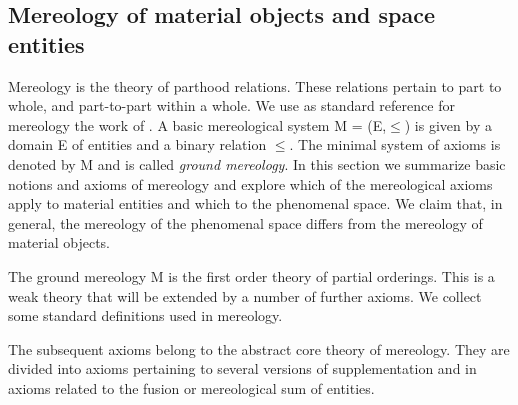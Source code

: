 \documentclass{ao2e}
\begin{document}
{\subsection{Mereology of material objects and space entities}           
Mereology is the theory of parthood relations. These relations pertain to part to whole, and part-to-part within a whole. We use as standard reference for mereology the work of \cite{simons-p-1987-a}. A basic mereological system M = (E,$\leq$) is given by a domain E of entities and a binary relation $\leq$. The minimal system of axioms is denoted by M and is called \textit{ground mereology}. In this section we summarize basic notions and axioms of mereology and explore which of the mereological axioms apply to material entities and which to the phenomenal space. We claim that, in general, the mereology of the phenomenal space differs from the mereology of material objects. 


\begin{enumAx}[MA]
   
   
\end{enumAx}  

The ground mereology M is the first order theory of partial orderings. This is a weak theory that will be extended by a number of further axioms. We collect some standard definitions used in mereology. 

\begin{enumAx}[MD]
   
   


   
   


\end{enumAx}  

The subsequent axioms belong to the abstract core theory of mereology. They are divided into axioms
pertaining to several versions of supplementation and in axioms related to the fusion or mereological sum of
entities.
 
}
\end{document}

